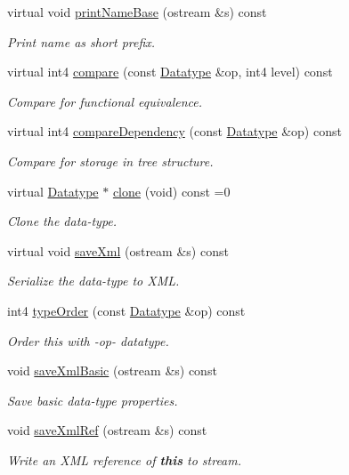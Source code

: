 \begin{DoxyCompactItemize}
virtual void \mbox{\hyperlink{class_datatype_aec50467c2d81d22daf052a95e283a24a}{print\+Name\+Base}} (ostream \&s) const
\begin{DoxyCompactList}\small\item\em Print name as short prefix. \end{DoxyCompactList}\item 
virtual int4 \mbox{\hyperlink{class_datatype_a4d5a102b2d909180c3080fdb55d7b305}{compare}} (const \mbox{\hyperlink{class_datatype}{Datatype}} \&op, int4 level) const
\begin{DoxyCompactList}\small\item\em Compare for functional equivalence. \end{DoxyCompactList}\item 
virtual int4 \mbox{\hyperlink{class_datatype_ab26e4ca2c3091d3c5a34b4fbd7be76ae}{compare\+Dependency}} (const \mbox{\hyperlink{class_datatype}{Datatype}} \&op) const
\begin{DoxyCompactList}\small\item\em Compare for storage in tree structure. \end{DoxyCompactList}\item 
virtual \mbox{\hyperlink{class_datatype}{Datatype}} $\ast$ \mbox{\hyperlink{class_datatype_a6bd032d91f40efe36841adc85b3ff0ec}{clone}} (void) const =0
\begin{DoxyCompactList}\small\item\em Clone the data-\/type. \end{DoxyCompactList}\item 
virtual void \mbox{\hyperlink{class_datatype_a33339824f1c50d4354952296070c3902}{save\+Xml}} (ostream \&s) const
\begin{DoxyCompactList}\small\item\em Serialize the data-\/type to X\+ML. \end{DoxyCompactList}\item 
int4 \mbox{\hyperlink{class_datatype_a97e8ffb05266d744b2a63d20a76a9974}{type\+Order}} (const \mbox{\hyperlink{class_datatype}{Datatype}} \&op) const
\begin{DoxyCompactList}\small\item\em Order this with -\/op-\/ datatype. \end{DoxyCompactList}\item 
void \mbox{\hyperlink{class_datatype_a27dc7495a59adaca34b83366a963fd45}{save\+Xml\+Basic}} (ostream \&s) const
\begin{DoxyCompactList}\small\item\em Save basic data-\/type properties. \end{DoxyCompactList}\item 
void \mbox{\hyperlink{class_datatype_aa29b0b69af8ed3be7dc573e4a1e355a5}{save\+Xml\+Ref}} (ostream \&s) const
\begin{DoxyCompactList}\small\item\em Write an X\+ML reference of {\bfseries{this}} to stream. \end{DoxyCompactList}\end{DoxyCompactItemize}
